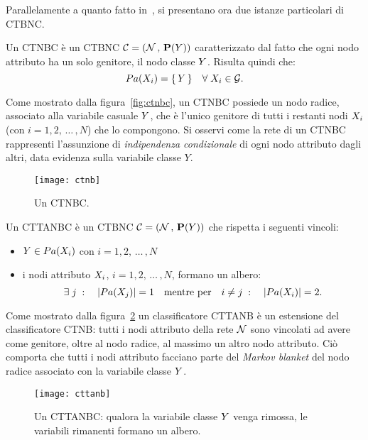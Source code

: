 Parallelamente a quanto fatto in~\citet{Langley1992}, si presentano ora due istanze particolari di \acl{CTBNC}.

\begin{definizione}\label{defn:ctnbc}
Un \acf{CTNBC} è un \acl{CTBNC} $\mathcal{C}=(\mathcal{N}\,,\,\mathbf{P}(\mathnormal{Y}))$ caratterizzato dal fatto che ogni nodo attributo ha un solo genitore, il nodo classe $\mathnormal{Y}$. Risulta quindi che:
\[
Pa(\mathnormal{X}_i)=\{\,\mathnormal{Y}\,\} \quad \forall \; \mathnormal{X}_i \in \mathcal{G}\text{.}
\]
\end{definizione}
Come mostrato dalla figura~\vref{fig:ctnbc}, un \acs{CTNBC} possiede un nodo radice, associato alla variabile casuale $\mathnormal{Y}$, che è l'unico genitore di tutti i restanti nodi $\mathnormal{X}_i$ (con $i=1,2,\,\dotsc\,,N$) che lo compongono. Si osservi come la rete di un \acs{CTNBC} rappresenti l'assunzione di \emph{indipendenza condizionale} di ogni nodo attributo dagli altri, data evidenza sulla variabile classe $Y$.

\begin{figure}[b]
\centering
\texttt{[image: ctnb]}
\caption[Un \acs{CTNBC}]{Un \acf{CTNBC}.}
\label{fig:ctnbc}
\end{figure}

\begin{definizione}\label{defn:cttanbc}
Un \acf{CTTANBC} è un \acl{CTBNC} $\mathcal{C}=(\mathcal{N}\,,\,\mathbf{P}(\mathnormal{Y}))$ che rispetta i seguenti vincoli:
\begin{itemize}
    \item $\mathnormal{Y} \in Pa(\mathnormal{X}_i)$ con $i=1,2,\,\dotsc\,,N$
    \item i nodi attributo $\mathnormal{X}_i$, $i=1,2,\,\dotsc\,,N$, formano un albero:
    \[
    \exists \; j \; : \quad |Pa(\mathnormal{X}_j)|=1 \quad \text{mentre per} \quad i \neq j \; : \quad |Pa(\mathnormal{X}_i)|=2\text{.}
    \]
\end{itemize}
\end{definizione}
Come mostrato dalla figura~\ref{fig:cttanbc} un classificatore \acs{CTTANB} è un estensione del classificatore \acs{CTNB}: tutti i nodi attributo della rete $\mathcal{N}$ sono vincolati ad avere come genitore, oltre al nodo radice, al massimo un altro nodo attributo. Ciò comporta che tutti i nodi attributo facciano parte del \emph{Markov blanket} del nodo radice associato con la variabile classe $\mathnormal{Y}$.

\begin{figure}
\centering
\texttt{[image: cttanb]}
\caption[Un \acs{CTTANBC}]{Un \acf{CTTANBC}: qualora la variabile classe $\mathnormal{Y}$ venga rimossa, le variabili rimanenti formano un albero.}
\label{fig:cttanbc}
\end{figure}

